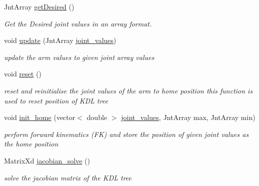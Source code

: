 \begin{DoxyCompactItemize}
Jnt\+Array \hyperlink{classKDL__IK_a1e6c6aeb2f702fe462f593946c120f32}{get\+Desired} ()
\begin{DoxyCompactList}\small\item\em Get the Desired joint values in an array format. \end{DoxyCompactList}\item 
void \hyperlink{classKDL__IK_ad134c076c73720c08a77aaf80f9dfa94}{update} (Jnt\+Array \hyperlink{classKDL__IK_a0b1e97f5d23c79a40986acbf2d1d5472}{joint\+\_\+values})
\begin{DoxyCompactList}\small\item\em update the arm values to given joint array values \end{DoxyCompactList}\item 
\mbox{\label{classKDL__IK_a94402e5421e60289a2593164c4c9c8db}} 
void \hyperlink{classKDL__IK_a94402e5421e60289a2593164c4c9c8db}{reset} ()
\begin{DoxyCompactList}\small\item\em reset and reinitialise the joint values of the arm to home position this function is used to reset position of K\+DL tree \end{DoxyCompactList}\item 
void \hyperlink{classKDL__IK_ab9717f11ad7991e06ed688ce1c803b85}{init\+\_\+home} (vector$<$ double $>$ \hyperlink{classKDL__IK_a0b1e97f5d23c79a40986acbf2d1d5472}{joint\+\_\+values}, Jnt\+Array max, Jnt\+Array min)
\begin{DoxyCompactList}\small\item\em perform forward kinematics (FK) and store the position of given joint values as the home position \end{DoxyCompactList}\item 
Matrix\+Xd \hyperlink{classKDL__IK_a6560fe32bf60646cb298e9f6751c2d79}{jacobian\+\_\+solve} ()
\begin{DoxyCompactList}\small\item\em solve the jacobian matrix of the K\+DL tree \end{DoxyCompactList}\end{DoxyCompactItemize}
